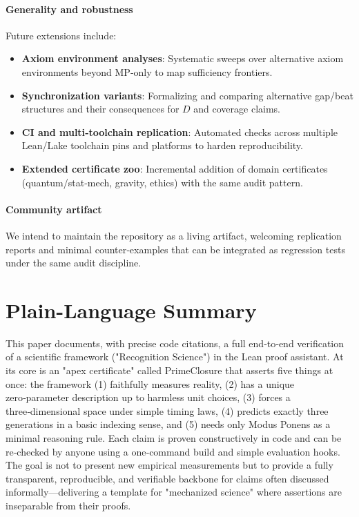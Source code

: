 \documentclass{article}
\begin{document}
\paragraph{Generality and robustness} Future extensions include:
\begin{itemize}[leftmargin=*]
  \item \textbf{Axiom environment analyses}: Systematic sweeps over alternative axiom environments beyond MP‑only to map sufficiency frontiers.
  \item \textbf{Synchronization variants}: Formalizing and comparing alternative gap/beat structures and their consequences for \(D\) and coverage claims.
  \item \textbf{CI and multi‑toolchain replication}: Automated checks across multiple Lean/Lake toolchain pins and platforms to harden reproducibility.
  \item \textbf{Extended certificate zoo}: Incremental addition of domain certificates (quantum/stat‑mech, gravity, ethics) with the same audit pattern.
\end{itemize}

\paragraph{Community artifact} We intend to maintain the repository as a living artifact, welcoming replication reports and minimal counter‑examples that can be integrated as regression tests under the same audit discipline.

\section{Plain-Language Summary}
This paper documents, with precise code citations, a full end‑to‑end verification of a scientific framework ("Recognition Science") in the Lean proof assistant. At its core is an "apex certificate" called PrimeClosure that asserts five things at once: the framework (1) faithfully measures reality, (2) has a unique zero‑parameter description up to harmless unit choices, (3) forces a three‑dimensional space under simple timing laws, (4) predicts exactly three generations in a basic indexing sense, and (5) needs only Modus Ponens as a minimal reasoning rule. Each claim is proven constructively in code and can be re‑checked by anyone using a one‑command build and simple evaluation hooks. The goal is not to present new empirical measurements but to provide a fully transparent, reproducible, and verifiable backbone for claims often discussed informally—delivering a template for "mechanized science" where assertions are inseparable from their proofs.
\end{document}
